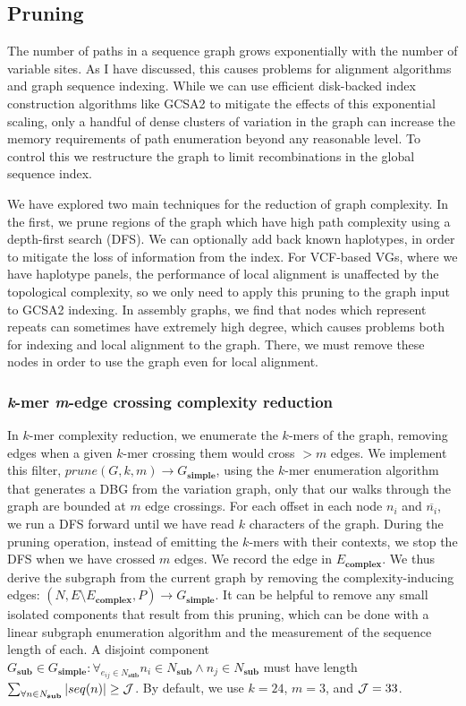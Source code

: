 \documentclass[a4paper,12pt,numbered,oneside]{Classes/PhDThesisPSnPDF}
\begin{document}
\subsection{Pruning}

The number of paths in a sequence graph grows exponentially with the number of variable sites.
As I have discussed, this causes problems for alignment algorithms and graph sequence indexing.
While we can use efficient disk-backed index construction algorithms like GCSA2 to mitigate the effects of this exponential scaling, only a handful of dense clusters of variation in the graph can increase the memory requirements of path enumeration beyond any reasonable level.
To control this we restructure the graph to limit recombinations in the global sequence index.

We have explored two main techniques for the reduction of graph complexity.
In the first, we prune regions of the graph which have high path complexity using a depth-first search (DFS).
We can optionally add back known haplotypes, in order to mitigate the loss of information from the index.
For VCF-based VGs, where we have haplotype panels, the performance of local alignment is unaffected by the topological complexity, so we only need to apply this pruning to the graph input to GCSA2 indexing.
In assembly graphs, we find that nodes which represent repeats can sometimes have extremely high degree, which causes problems both for indexing and local alignment to the graph.
There, we must remove these nodes in order to use the graph even for local alignment.

\subsubsection{\emph{k}-mer \emph{m}-edge crossing complexity reduction}

In $k$-mer complexity reduction, we enumerate the $k$-mers of the graph, removing edges when a given $k$-mer crossing them would cross $> m$ edges.
We implement this filter, $prune(G, k, m) \to G_\textbf{simple}$, using the $k$-mer enumeration algorithm that generates a DBG from the variation graph, only that our walks through the graph are bounded at $m$ edge crossings.
For each offset in each node $n_i$ and $\overline{n_i}$, we run a DFS forward until we have read $k$ characters of the graph.
During the pruning operation, instead of emitting the $k$-mers with their contexts, we stop the DFS when we have crossed $m$ edges.
We record the edge in $E_\textbf{complex}$. %
We thus derive the subgraph from the current graph by removing the complexity-inducing edges: $(N, E \setminus E_\textbf{complex}, P) \to G_\textbf{simple}$.
It can be helpful to remove any small isolated components that result from this pruning, which can be done with a linear subgraph enumeration algorithm and the measurement of the sequence length of each.
A disjoint component $G_\textbf{sub} \in G_\textbf{simple} : \forall_{e_{ij} \in N_\textbf{sub}} n_i \in N_\textbf{sub} \land n_j \in N_\textbf{sub}$ must have length $\sum_{\forall n \in N_\textbf{sub}} |seq(n)| \geq {\cal J}$.
By default, we use $k=24$, $m=3$, and ${\cal J}=33$.
\end{document}
